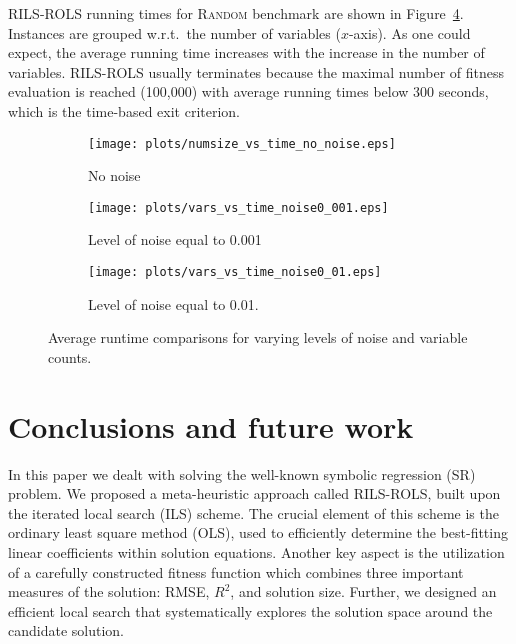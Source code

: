 \documentclass{bmcart}
\begin{document}
\textsc{RILS}-\textsc{ROLS} running times for \textsc{Random} benchmark are shown in Figure~\ref{fig:runtime_rils_rols}. Instances are grouped w.r.t.\ the number of variables ($x$-axis). 
As one could expect, the average running time increases with the increase in the number of variables. 
\textsc{RILS-ROLS} usually terminates because the maximal number of fitness evaluation is reached (100,000) with average running times below 300 seconds, which is the time-based exit criterion.

\begin{figure}[!h]
	\begin{subfigure}[b]{0.45\textwidth}
		\texttt{[image: plots/numsize\_vs\_time\_no\_noise.eps]}
		\caption{No noise}
		\label{fig:time-no-noise}
	\end{subfigure}
	\hfill
	\begin{subfigure}[b]{0.45\textwidth}
		
		\texttt{[image: plots/vars\_vs\_time\_noise0\_001.eps]}
		\caption{Level of noise equal to 0.001}
		\label{fig:time-noise0.001}
	\end{subfigure}
	\centering
	\begin{subfigure}[b]{0.40\textwidth}
		\texttt{[image: plots/vars\_vs\_time\_noise0\_01.eps]}
		\caption{Level of noise equal to 0.01.}
		\label{fig:time-noise0.01}
	\end{subfigure}
	\caption{Average runtime comparisons for varying levels of noise and variable counts.}
	\label{fig:runtime_rils_rols}
\end{figure}


\section{Conclusions and future work}\label{sec:conclusions}

In this paper we dealt with solving the well-known symbolic regression (SR)  problem.  
We proposed a meta-heuristic approach called \textsc{RILS}-\textsc{ROLS}, built upon the iterated local search (ILS) scheme. The crucial element of this scheme is the ordinary least square method (OLS), used to efficiently determine the best-fitting linear coefficients within solution equations. 
Another key aspect is the utilization of a carefully constructed fitness function which combines three important measures of the solution: RMSE, $R^2$, and solution size. 
Further, we designed an efficient local search that systematically explores the solution space around the candidate solution.
\end{document}
